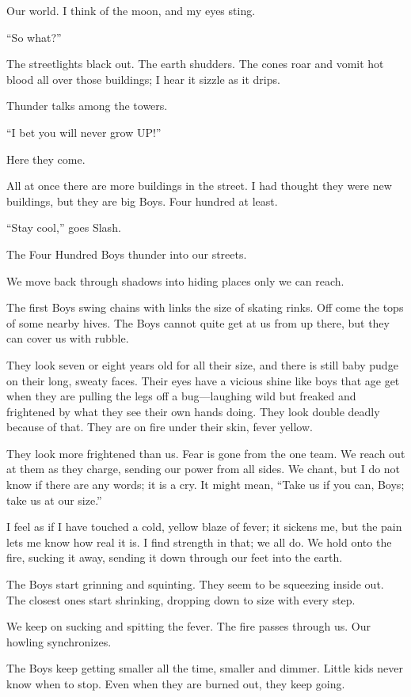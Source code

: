 Our world. I think of the moon, and my eyes sting.

``So what?''

The streetlights black out. The earth shudders. The cones roar and vomit hot blood all over those buildings; I hear it sizzle as it drips.

Thunder talks among the towers.

``I bet you will never grow UP!''

Here they come.

All at once there are more buildings in the street. I had thought they were new buildings, but they are big Boys. Four hundred at least.

``Stay cool,'' goes Slash.

The Four Hundred Boys thunder into our streets.

We move back through shadows into hiding places only we can reach.

The first Boys swing chains with links the size of skating rinks. Off come the tops of some nearby hives. The Boys cannot quite get at us from up there, but they can cover us with rubble.

They look seven or eight years old for all their size, and there is still baby pudge on their long, sweaty faces. Their eyes have a vicious shine like boys that age get when they are pulling the legs off a bug—laughing wild but freaked and frightened by what they see their own hands doing. They look double deadly because of that. They are on fire under their skin, fever yellow.

They look more frightened than us. Fear is gone from the one team. We reach out at them as they charge, sending our power from all sides. We chant, but I do not know if there are any words; it is a cry. It might mean, ``Take us if you can, Boys; take us at our size.''

I feel as if I have touched a cold, yellow blaze of fever; it sickens me, but the pain lets me know how real it is. I find strength in that; we all do. We hold onto the fire, sucking it away, sending it down through our feet into the earth.

The Boys start grinning and squinting. They seem to be squeezing inside out. The closest ones start shrinking, dropping down to size with every step.

We keep on sucking and spitting the fever. The fire passes through us. Our howling synchronizes.

The Boys keep getting smaller all the time, smaller and dimmer. Little kids never know when to stop. Even when they are burned out, they keep going.

